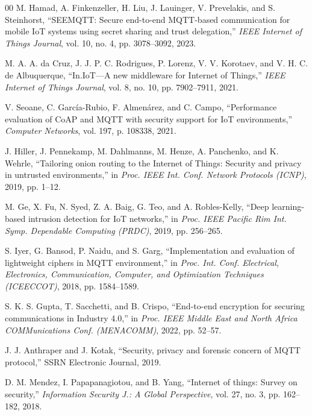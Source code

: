 \documentclass[conference]{IEEEtran}
\begin{document}
\begin{thebibliography}{00}
M. Hamad, A. Finkenzeller, H. Liu, J. Lauinger, V. Prevelakis, and S. Steinhorst, ``SEEMQTT: Secure end-to-end MQTT-based communication for mobile IoT systems using secret sharing and trust delegation,'' \textit{IEEE Internet of Things Journal}, vol. 10, no. 4, pp. 3078--3092, 2023.

M. A. A. da Cruz, J. J. P. C. Rodrigues, P. Lorenz, V. V. Korotaev, and V. H. C. de Albuquerque, ``In.IoT---A new middleware for Internet of Things,'' \textit{IEEE Internet of Things Journal}, vol. 8, no. 10, pp. 7902--7911, 2021.

V. Seoane, C. Garc\'{i}a-Rubio, F. Almen\'{a}rez, and C. Campo, ``Performance evaluation of CoAP and MQTT with security support for IoT environments,'' \textit{Computer Networks}, vol. 197, p. 108338, 2021.

J. Hiller, J. Pennekamp, M. Dahlmanns, M. Henze, A. Panchenko, and K. Wehrle, ``Tailoring onion routing to the Internet of Things: Security and privacy in untrusted environments,'' in \textit{Proc. IEEE Int. Conf. Network Protocols (ICNP)}, 2019, pp. 1--12.

M. Ge, X. Fu, N. Syed, Z. A. Baig, G. Teo, and A. Robles-Kelly, ``Deep learning-based intrusion detection for IoT networks,'' in \textit{Proc. IEEE Pacific Rim Int. Symp. Dependable Computing (PRDC)}, 2019, pp. 256--265.

S. Iyer, G. Bansod, P. Naidu, and S. Garg, ``Implementation and evaluation of lightweight ciphers in MQTT environment,'' in \textit{Proc. Int. Conf. Electrical, Electronics, Communication, Computer, and Optimization Techniques (ICEECCOT)}, 2018, pp. 1584--1589.

S. K. S. Gupta, T. Sacchetti, and B. Crispo, ``End-to-end encryption for securing communications in Industry 4.0,'' in \textit{Proc. IEEE Middle East and North Africa COMMunications Conf. (MENACOMM)}, 2022, pp. 52--57.

J. J. Anthraper and J. Kotak, ``Security, privacy and forensic concern of MQTT protocol,'' SSRN Electronic Journal, 2019.

D. M. Mendez, I. Papapanagiotou, and B. Yang, ``Internet of things: Survey on security,'' \textit{Information Security J.: A Global Perspective}, vol. 27, no. 3, pp. 162--182, 2018.


\end{thebibliography}
\end{document}
